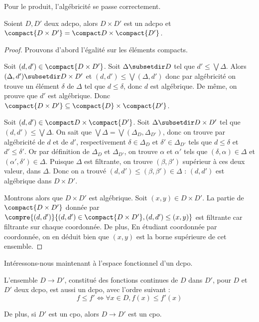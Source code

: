 Pour le produit, l'algébricité se passe correctement.

\begin{prop}
    Soient $D,D'$ deux adcpo, alors $D\times D'$ est un adcpo et $\compact{D\times D'}=\compact D\times \compact{D'}$.
\end{prop}

\begin{proof}
    Prouvons d'abord l'égalité sur les éléments compacts.
    
    Soit $(d,d')\in\compact{D\times D'}$. Soit $\Delta\subsetdir D$ tel que $d'\leq \bigvee \Delta$. Alors $(\Delta,d')\subsetdir D\times D'$ et $(d,d')\leq \bigvee (\Delta,d')$ donc par algébricité on trouve un élément $\delta$ de $\Delta$ tel que $d\leq \delta$, donc $d$ est algébrique. De même, on prouve que $d'$ est algébrique. Donc $\compact{D\times D'}\subseteq \compact{D}\times\compact{D'}$.
    
    Soit $(d,d')\in\compact D\times \compact{D'}$. Soit $\Delta\subsetdir D\times D'$ tel que $(d,d')\leq \bigvee \Delta$. On sait que $\bigvee\Delta=\bigvee(\Delta_D,\Delta_{D'})$, donc on trouve par algébricité de $d$ et de $d'$, respectivement $\delta\in\Delta_D$ et $\delta'\in\Delta_{D'}$ tels que $d\leq \delta$ et $d'\leq \delta'$. Or par définition de $\Delta_D$ et $\Delta_{D'}$, on trouve $\alpha$ et $\alpha'$ tels que $(\delta,\alpha)\in\Delta$ et $(\alpha',\delta')\in\Delta$. Puisque $\Delta$ est filtrante, on trouve $(\beta,\beta')$ supérieur à ces deux valeur, dans $\Delta$. Donc on a trouvé $(d,d')\leq (\beta,\beta')\in\Delta$ : $(d,d')$ est algébrique dans $D\times D'$.
    
    Montrons alors que $D\times D'$ est algébrique. Soit $(x,y)\in D\times D'$. La partie de $\compact{D\times D'}$ donnée par $\compre{(d,d')}{(d,d')\in\compact{D\times D'},(d,d')\leq (x,y)}$ est filtrante car filtrante sur chaque coordonnée. De plus, En étudiant coordonnée par coordonnée, on en déduit bien que $(x,y)$ est la borne supérieure de cet ensemble.
\end{proof}

Intéressons-nous maintenant à l'espace fonctionnel d'un dcpo.

\begin{defi}
    L'ensemble $D\to D'$, constitué des fonctions continues de $D$ dans $D'$, pour $D$ et $D'$ deux dcpo, est aussi un dcpo, avec l'ordre suivant :
    $$f\leq f'\iff \forall x\in D, f(x)\leq f'(x)$$
    
    De plus, si $D'$ est un cpo, alors $D\to D'$ est un cpo.
\end{defi}

